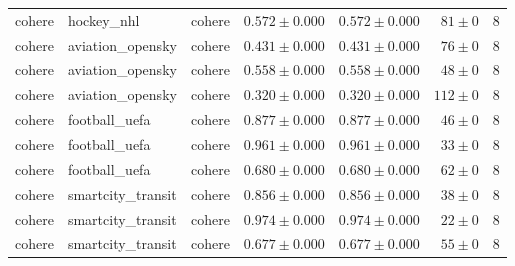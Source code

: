 \begin{table}[htbp]
\begin{tabular}{l l l r r r r}
cohere & hockey\_nhl & cohere & $0.572\pm0.000$ & $0.572\pm0.000$ & $81\pm0$ & 8 \\
cohere & aviation\_opensky & cohere & $0.431\pm0.000$ & $0.431\pm0.000$ & $76\pm0$ & 8 \\
cohere & aviation\_opensky & cohere & $0.558\pm0.000$ & $0.558\pm0.000$ & $48\pm0$ & 8 \\
cohere & aviation\_opensky & cohere & $0.320\pm0.000$ & $0.320\pm0.000$ & $112\pm0$ & 8 \\
cohere & football\_uefa & cohere & $0.877\pm0.000$ & $0.877\pm0.000$ & $46\pm0$ & 8 \\
cohere & football\_uefa & cohere & $0.961\pm0.000$ & $0.961\pm0.000$ & $33\pm0$ & 8 \\
cohere & football\_uefa & cohere & $0.680\pm0.000$ & $0.680\pm0.000$ & $62\pm0$ & 8 \\
cohere & smartcity\_transit & cohere & $0.856\pm0.000$ & $0.856\pm0.000$ & $38\pm0$ & 8 \\
cohere & smartcity\_transit & cohere & $0.974\pm0.000$ & $0.974\pm0.000$ & $22\pm0$ & 8 \\
cohere & smartcity\_transit & cohere & $0.677\pm0.000$ & $0.677\pm0.000$ & $55\pm0$ & 8 \\
\hline
\end{tabular}
\end{table}
